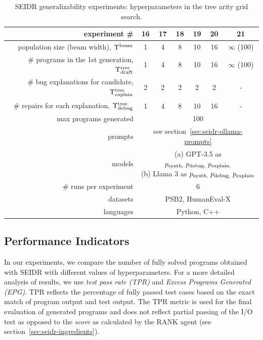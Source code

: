 \begin{table}
\setlength{\tabcolsep}{10pt}
\centering
\caption{SEIDR generalizability experiments: hyperparameters in the tree arity grid search.}\small
\label{tab:w-n-generalizability}
\begin{tabular}{rcccccc}
\toprule
experiment \# & 16 & 17 & 18 & 19 & 20 & 21\\
\midrule
population size (beam width), $\Upsilon^\text{beam}{}$ & 1 & 4 & 8 & 10 & 16 & $\infty$ (100) \\[4pt]
\# programs in the 1st generation, $\Upsilon^\text{tree}_\text{draft}$ & 1 & 4 & 8 & 10 & 16 & $\infty$ (100) \\[4pt]
\# bug explanations for candidate, $\Upsilon^\text{tree}_\text{explain}$ & 2 & 2 & 2 & 2 & 2 & - \\[4pt]
\# repairs for each explanation, $\Upsilon^\text{tree}_\text{debug}$ & 1 & 4 & 8 & 10 & 16 & - \\[4pt]
\midrule
max programs generated & \multicolumn{6}{c}{100} \\[4pt]
prompts & \multicolumn{6}{c}{see section~\ref{sec:seidr-ollama-prompts}} \\[4pt]
models  & \multicolumn{6}{c}{
 \parbox{5cm}{
     (a) GPT-3.5 as $p_\text{synth,} \; p_\text{debug,} \; p_\text{explain,}$ \\
     (b) Llama 3 as $p_\text{synth,} \; p_\text{debug,} \; p_\text{explain}$
     }
} \\[10pt]
\midrule
\# runs per experiment &  \multicolumn{6}{c}{6} \\[4pt]
datasets  & \multicolumn{6}{c}{PSB2, HumanEval-X} \\[4pt] 
languages  & \multicolumn{6}{c}{Python, C++} \\[4pt]
\bottomrule
\end{tabular}
\end{table}

\newpage\subsection{Performance Indicators}
\label{sec:seidr-metrics}

\sloppy %
In our experiments, we compare 
the number of fully solved programs obtained with SEIDR with different values of hyperparameters. 
For a more detailed analysis of results, we use \emph{test pass rate (TPR)} and \emph{Excess Programs Generated (EPG)}.
TPR reflects the percentage of fully passed test cases based on the exact match of program output and test output. 
The TPR metric is used for the final evaluation of generated programs and does not reflect partial passing of the I/O test as opposed to the \emph{score} as calculated by the RANK agent (see section~\ref{sec:seidr-ingredients}). 

